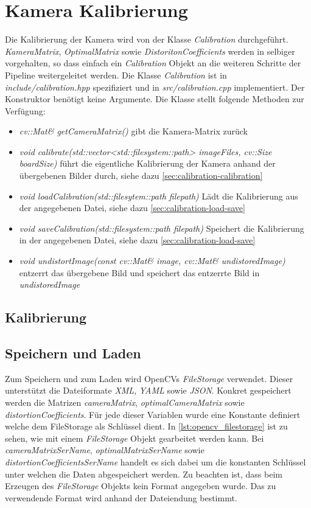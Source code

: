 \section{Kamera Kalibrierung}
Die Kalibrierung der Kamera wird von der Klasse \emph{Calibration} durchgeführt.
\emph{KameraMatrix}, \emph{OptimalMatrix} sowie \emph{DistoritonCoefficients} werden in selbiger vorgehalten, so dass einfach ein \emph{Calibration} Objekt an die weiteren Schritte der Pipeline weitergeleitet werden.
Die Klasse \emph{Calibration} ist in \emph{include/calibration.hpp} spezifiziert und in \emph{src/calibration.cpp} implementiert.
Der Konstruktor benötigt keine Argumente.
Die Klasse stellt folgende Methoden zur Verfügung:
\begin{itemize}
\item \emph{cv::Mat\& getCameraMatrix()} gibt die Kamera-Matrix zurück
\item \emph{void calibrate(std::vector<std::filesystem::path> imageFiles, cv::Size boardSize)} führt die eigentliche Kalibrierung der Kamera anhand der übergebenen Bilder durch, siehe dazu \autoref{sec:calibration-calibration}
\item \emph{void loadCalibration(std::filesytem::path filepath)} Lädt die Kalibrierung aus der angegebenen Datei, siehe dazu \autoref{sec:calibration-load-save}
\item \emph{void saveCalibration(std::filesystem::path filepath)} Speichert die Kalibrierung in der angegebenen Datei, siehe dazu \autoref{sec:calibration-load-save}
\item \emph{void undistortImage(const cv::Mat\& image, cv::Mat\& undistoredImage)} entzerrt das übergebene Bild und speichert das entzerrte Bild in \emph{undistoredImage}
\end{itemize}

\subsection{Kalibrierung}\label{sec:calibration-calibration}


\subsection{Speichern und Laden}\label{sec:calibration-load-save}
Zum Speichern und zum Laden wird OpenCVs \emph{FileStorage} verwendet.
Dieser unterstützt die Dateiformate \emph{XML}, \emph{YAML} sowie \emph{JSON}.
Konkret gespeichert werden die Matrizen \emph{cameraMatrix}, \emph{optimalCameraMatrix} sowie \emph{distortionCoefficients}.
Für jede dieser Variablen wurde eine Konstante definiert welche dem FileStorage als Schlüssel dient.
In \autoref{lst:opencv_filestorage} ist zu sehen, wie mit einem \emph{FileStorage} Objekt gearbeitet werden kann.
Bei \emph{cameraMatrixSerName}, \emph{optimalMatrixSerName} sowie \emph{distortionCoefficientsSerName} handelt es sich dabei um die konstanten Schlüssel unter welchen die Daten abgespeichert werden.
Zu beachten ist, dass beim Erzeugen des \emph{FileStorage} Objekts kein Format angegeben wurde.
Das zu verwendende Format wird anhand der Dateiendung bestimmt.

